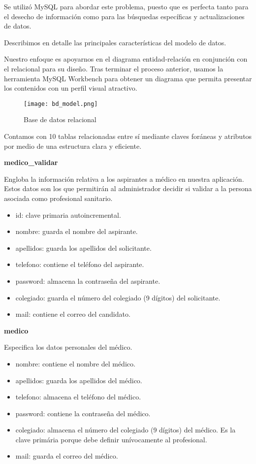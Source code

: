 \documentclass[11pt,spanish,
		listoftables,listoffigures]
		{tfgplantilla}
\begin{document}
Se utilizó MySQL para abordar este problema, puesto que es perfecta tanto para el desecho de información como para las búsquedas específicas y actualizaciones de datos.

Describimos en detalle las principales características del modelo de datos.

Nuestro enfoque es apoyarnos en el diagrama entidad-relación en conjunción con el relacional para su diseño. Tras terminar el proceso anterior, usamos la herramienta MySQL Workbench para obtener un diagrama que permita presentar los contenidos con un perfil visual atractivo.

\newpage
	\begin{figure}[H]
	\centering
	\texttt{[image: bd\_model.png]}
	\caption{Base de datos relacional}
	\end{figure}
\newpage

Contamos con 10 tablas relacionadas entre sí mediante claves foráneas y atributos por medio de una estructura clara y eficiente.

\noindent
\textbf {medico\_validar}

Engloba la información relativa a los aspirantes a médico en nuestra aplicación. Estos datos son los que permitirán al administrador decidir si validar a la persona asociada como profesional sanitario.
\begin{itemize}
	\item id: clave primaria autoincremental.
	\item nombre: guarda el nombre del aspirante.
	\item apellidos: guarda los apellidos del solicitante.
	\item telefono: contiene el teléfono del aspirante.
	\item password: almacena la contraseña del aspirante.
	\item colegiado: guarda el número del colegiado (9 dígitos) del solicitante.
	\item mail: contiene el correo del candidato.
\end{itemize}

\noindent
\textbf {medico}

Especifica los datos personales del médico.
\begin{itemize}	
	\item nombre: contiene el nombre del médico.
	\item apellidos: guarda los apellidos del médico.
	\item telefono: almacena el teléfono del médico.
	\item password: contiene la contraseña del médico.
	\item colegiado: almacena el número del colegiado (9 dígitos) del médico. Es la clave primária porque debe definir unívocamente al profesional.
	\item mail: guarda el correo del médico.
\end{itemize}
\end{document}
